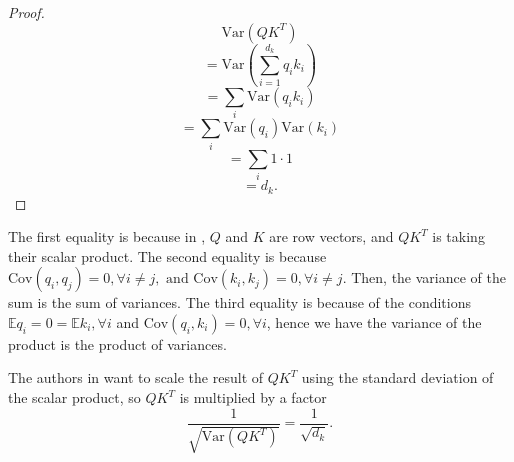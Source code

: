 \documentclass{article}
\theoremstyle{plain}
\theoremstyle{plain} %
\theoremstyle{definition}  %
\theoremstyle{remark}  %
\theoremstyle{plain}
\begin{document}
\begin{proof}
$$
\text{Var}\left( QK^T\right)
$$
$$
=\text{Var}\left( \sum\limits_{i=1}^{d_k}q_ik_i\right)
$$
$$
=\sum\limits_i \text{Var}\left( q_ik_i\right)
$$
$$
=\sum\limits_i \text{Var}\left( q_i\right) \text{Var}\left( k_i\right)
$$
$$
=\sum\limits_i 1\cdot 1
$$
$$
=d_k.
$$
\end{proof}
The first equality is because in \cite{vaswani2017attention}, $Q$ and $K$ are row vectors, and $QK^T$ is taking their scalar product. The second equality is because $\text{Cov}\left( q_i,q_j\right)=0, \forall i\neq j, \text{ and } \text{Cov}\left( k_i,k_j\right)=0, \forall i\neq j.$ Then, the variance of the sum is the sum of variances. The third equality is because of the conditions $\mathbb{E} q_i=0=\mathbb{E} k_i, \forall i$ and $\text{Cov}\left( q_i,k_i\right)=0, \forall i$, hence we have the variance of the product is the product of variances.

The authors in \cite{vaswani2017attention} want to scale the result of $QK^T$ using the standard deviation of the scalar product, so $QK^T$ is multiplied by a factor 
$$\frac{1}{\sqrt{\text{Var}\left(QK^T \right)}}=\frac{1}{\sqrt{d_k}}.$$



\end{document}
